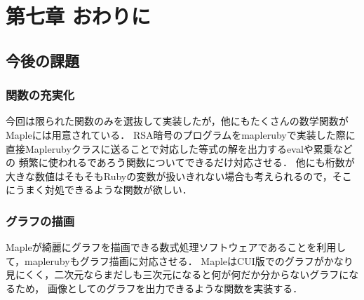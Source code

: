 \section{第七章 おわりに}
\subsection{今後の課題}
\subsubsection{関数の充実化}
今回は限られた関数のみを選抜して実装したが，他にもたくさんの数学関数がMapleには用意されている．
RSA暗号のプログラムをmaplerubyで実装した際に直接Maplerubyクラスに送ることで対応した等式の解を出力するevalや累乗などの
頻繁に使われるであろう関数についてできるだけ対応させる．
他にも桁数が大きな数値はそもそもRubyの変数が扱いきれない場合も考えられるので，そこにうまく対処できるような関数が欲しい．

\subsubsection{グラフの描画}
Mapleが綺麗にグラフを描画できる数式処理ソフトウェアであることを利用して，maplerubyもグラフ描画に対応させる．
MapleはCUI版でのグラフがかなり見にくく，二次元ならまだしも三次元になると何が何だか分からないグラフになるため，
画像としてのグラフを出力できるような関数を実装する．

